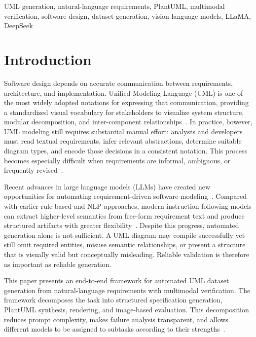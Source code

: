 \documentclass[conference]{IEEEtran}
\begin{document}
\begin{IEEEkeywords}
UML generation, natural-language requirements, PlantUML,
multimodal verification, software design, dataset generation,
vision-language models, LLaMA, DeepSeek
\end{IEEEkeywords}

\section{Introduction}

Software design depends on accurate communication between requirements,
architecture, and implementation. Unified Modeling Language (UML) is
one of the most widely adopted notations for expressing that
communication, providing a standardized visual vocabulary for
stakeholders to visualize system structure, modular decomposition, and
inter-component relationships~\cite{booch2005,ambler2004}. In practice,
however, UML modeling still requires substantial manual effort: analysts
and developers must read textual requirements, infer relevant
abstractions, determine suitable diagram types, and encode those
decisions in a consistent notation. This process becomes especially
difficult when requirements are informal, ambiguous, or frequently
revised~\cite{shinde2012,maatuk2021,abdelnabi2020}.

Recent advances in large language models (LLMs) have created new
opportunities for automating requirement-driven software
modeling~\cite{vaswani2017,brown2020}. Compared with earlier rule-based
and NLP approaches, modern instruction-following models can extract
higher-level semantics from free-form requirement text and produce
structured artifacts with greater flexibility~\cite{meng2024,yuan2025}.
Despite this progress, automated generation alone is not sufficient.
A UML diagram may compile successfully yet still omit required entities,
misuse semantic relationships, or present a structure that is visually
valid but conceptually misleading. Reliable validation is therefore
as important as reliable generation.

This paper presents an end-to-end framework for automated UML dataset
generation from natural-language requirements with multimodal
verification. The framework decomposes the task into structured
specification generation, PlantUML synthesis, rendering, and
image-based evaluation. This decomposition reduces prompt complexity,
makes failure analysis transparent, and allows different models to be
assigned to subtasks according to their strengths~\cite{wei2022}.
\end{document}
